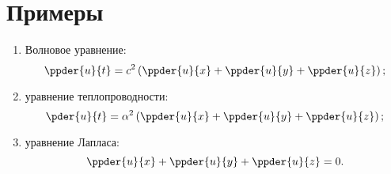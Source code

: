 \section{Примеры}

\begin{enumerate}
    \item Волновое уравнение:
    \[
        \ppder{u}{t} = c^2\left(\ppder{u}{x} + \ppder{u}{y} +
        \ppder{u}{z}\right);
    \]

    \item уравнение теплопроводности:
    \[
        \pder{u}{t} = \alpha^2\left(\ppder{u}{x} + \ppder{u}{y} +
        \ppder{u}{z}\right);
    \]

    \item уравнение Лапласа:
    \[
        \ppder{u}{x} + \ppder{u}{y} + \ppder{u}{z} = 0.
    \]
\end{enumerate}

\newpage %
